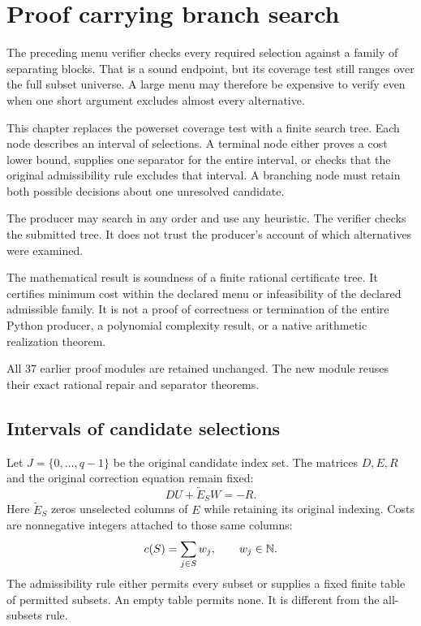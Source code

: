 \section{Proof carrying branch search}\label{CR:cr-source-section-11}
\label{CR:ch:branch-search}

The preceding menu verifier checks every required selection against a family of separating blocks. That is a sound endpoint, but its coverage test still ranges over the full subset universe. A large menu may therefore be expensive to verify even when one short argument excludes almost every alternative.

This chapter replaces the powerset coverage test with a finite search tree. Each node describes an interval of selections. A terminal node either proves a cost lower bound, supplies one separator for the entire interval, or checks that the original admissibility rule excludes that interval. A branching node must retain both possible decisions about one unresolved candidate.

The producer may search in any order and use any heuristic. The verifier checks the submitted tree. It does not trust the producer's account of which alternatives were examined.

\begin{scopebox}[title=The new verified boundary]
The mathematical result is soundness of a finite rational certificate tree. It certifies minimum cost within the declared menu or infeasibility of the declared admissible family. It is not a proof of correctness or termination of the entire Python producer, a polynomial complexity result, or a native arithmetic realization theorem.

All 37 earlier proof modules are retained unchanged. The new module reuses their exact rational repair and separator theorems.
\end{scopebox}

\subsection{Intervals of candidate selections}

Let $J=\{0,\ldots,q-1\}$ be the original candidate index set. The matrices $D,E,R$ and the original correction equation remain fixed:
\[
 DU+\widetilde E_S W=-R.
\]
Here $\widetilde E_S$ zeros unselected columns of $E$ while retaining its original indexing. Costs are nonnegative integers attached to those same columns:
\[
 c(S)=\sum_{j\in S}w_j,\qquad w_j\in\mathbb{N}.
\]
The admissibility rule either permits every subset or supplies a fixed finite table of permitted subsets. An empty table permits none. It is different from the all-subsets rule.

